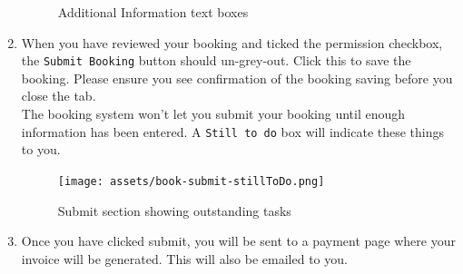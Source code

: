 \begin{enumerate}
\begin{figure}[H]
        \caption{Additional Information text boxes}
    \end{figure}
    \item When you have reviewed your booking and ticked the permission checkbox, the \verb|Submit Booking| button should un-grey-out. Click this to save the booking. Please ensure you see confirmation of the booking saving before you close the tab.\\
    The booking system won't let you submit your booking until enough information has been entered. A \verb|Still to do| box will indicate these things to you.
    \begin{figure}[H]
        \centering
        \texttt{[image: assets/book-submit-stillToDo.png]}
        \caption{Submit section showing outstanding tasks}
    \end{figure}
    \item Once you have clicked submit, you will be sent to a payment page where your invoice will be generated. This will also be emailed to you.
\end{enumerate}